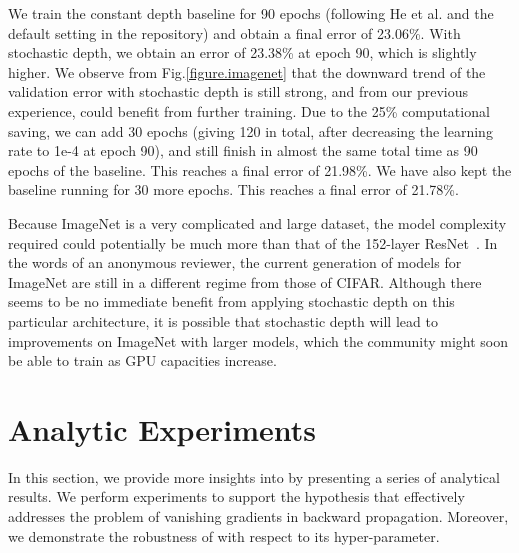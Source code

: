 \documentclass[runningheads]{llncs}
\begin{document}
We train the constant depth baseline for 90 epochs (following He et al. and the default setting in the repository) and obtain a final error of 23.06\%. With stochastic depth, we obtain an error of 23.38\% at epoch 90, which is slightly higher. We observe from Fig.\ref{figure.imagenet} that the downward trend of the validation error with stochastic depth is still strong, and from our previous experience, could benefit from further training. Due to the 25\% computational saving, we can add 30 epochs (giving 120 in total, after decreasing the learning rate to 1e-4 at epoch 90), and still finish in almost the same total time as 90 epochs of the baseline. This reaches a final error of 21.98\%. We have also kept the baseline running for 30 more epochs. This reaches a final error of 21.78\%. 

Because ImageNet is a very complicated and large dataset, the model complexity required could potentially be much more than that of the 152-layer ResNet~\cite{he2016identity}. In the words of an anonymous reviewer, the current generation of models for ImageNet are still in a different regime from those of CIFAR. Although there seems to be no immediate benefit from applying stochastic depth on this particular architecture, it is possible that stochastic depth will lead to improvements on ImageNet with larger models, which the community might soon be able to train as GPU capacities increase. 


\section{Analytic Experiments}

\label{sec_analysis}



In this section, we provide more insights into \name{} by presenting a series of analytical results. We perform experiments to support the hypothesis that \name{} effectively addresses the problem of vanishing gradients in backward propagation. Moreover, we demonstrate the robustness of \name{} with respect to its hyper-parameter.
\end{document}
